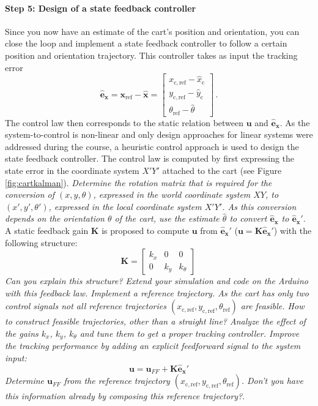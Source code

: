 \documentclass[10pt,a4paper]{article}
\begin{document}
\paragraph{Step 5: Design of a state feedback controller}
Since you now have an estimate of the cart's position and orientation, you can close the loop and implement a state feedback controller to follow a certain position and orientation trajectory. This controller takes as input the tracking error
\begin{equation}
    \mathbf{\hat{e}_x} = \mathbf{x}_{\mathrm{ref}} - \mathbf{\hat{x}} %
                      = \begin{bmatrix} x_{\mathrm{c,ref}} - \hat{x}_{\mathrm{c}} \\ y_{\mathrm{c,ref}} - \hat{y}_{\mathrm{c}}  \\ \theta_{\mathrm{ref}} -\hat{\theta}\end{bmatrix}\,.
\end{equation}
The control law then corresponds to the static relation between $\mathbf{u}$ and $\mathbf{\hat{e}_x}$. As the system-to-control is non-linear and only design approaches for linear systems were addressed during the course, a heuristic control approach is used to design the state feedback controller. The control law is computed by first expressing the state error in the coordinate system $X'Y'$ attached to the cart (see Figure \ref{fig:cartkalman}). \textit{Determine the rotation matrix that is required for the conversion of $(x,y,\theta)$, expressed in the world coordinate system $XY$, to $(x',y',\theta')$, expressed in the local coordinate system $X'Y'$. As this conversion depends on the orientation $\theta$ of the cart, use the estimate $\hat{\theta}$ to convert $\mathbf{\hat{e}_x}$ to $\mathbf{\hat{e}_x}'$}.
A static feedback gain $\mathbf{K}$ is proposed to compute $\mathbf{u}$ from $\mathbf{\hat{e}_x}'$ ($\mathbf{u} = \mathbf{K} \mathbf{\hat{e}_x}'$) with the following structure:
\begin{equation}
\mathbf{K} = \begin{bmatrix} k_x & 0 & 0 \\ 0 & k_y & k_\theta \end{bmatrix}\,
\end{equation}
\textit{Can you explain this structure? Extend your simulation and code on the Arduino with this feedback law. Implement a reference trajectory. As the cart has only two control signals not all reference trajectories $(x_{\mathrm{c,ref}},y_{\mathrm{c,ref}},\theta_{\mathrm{ref}})$ are feasible. How to construct feasible trajectories, other than a straight line? Analyze the effect of the gains $k_x$, $k_y$, $k_\theta$ and tune them to get a proper tracking controller. Improve the tracking performance by adding an explicit feedforward signal to the system input:
\begin{equation}
\mathbf{u} = \mathbf{u}_{FF} + \mathbf{K}\mathbf{\hat{e}_x}'
\end{equation}
Determine $\mathbf{u}_{FF}$ from the reference trajectory $(x_{\mathrm{c,ref}},y_{\mathrm{c,ref}},\theta_{\mathrm{ref}})$. Don't you have this information already by composing this reference trajectory?}.
\end{document}
